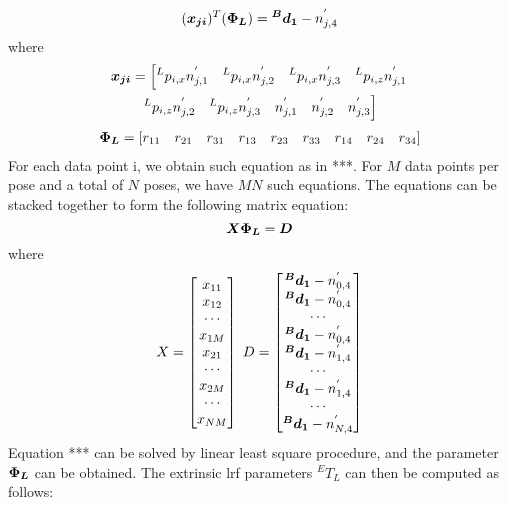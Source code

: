 \begin{equation}
  (\vb*{x_{ji}})  ^T (\vb*{\Phi_L}) = \vb*{{^B}d_1} -  n^{'}_{j,4}
\end{equation}
where 
\begin{multline}
  \vb*{x_{ji}} = \left[{^L}p_{i,x}n^{'}_{j,1} \quad {^L}p_{i,x}n^{'}_{j,2}\quad {^L}p_{i,x}n^{'}_{j,3}\quad  {^L}p_{i,z}n^{'}_{j,1}\right. \\ 
\left. {^L}p_{i,z}n^{'}_{j,2}\quad {^L}p_{i,z}n^{'}_{j,3} \quad n^{'}_{j,1} \quad n^{'}_{j,2} \quad n^{'}_{j,3} \right]
\end{multline}
\begin{multline}
  \vb*{\Phi_L} = \left[r_{11} \quad r_{21} \quad r_{31} \quad r_{13} \quad r_{23} \quad r_{33} \quad r_{14} \quad r_{24}  \quad r_{34} \right] 
\end{multline}
For each data point i, we obtain such equation as in ***. For $M$ data points per pose and a total of $N$ poses, we have $MN$ such equations. The equations can be stacked together to form the following matrix equation:
\begin{equation}
  \vb*{X}   \vb*{\Phi_L} = \vb*{D}
\end{equation}
where 
\begin{equation}
X =\begin{bmatrix}
x_{11} \\ x_{12} \\ \cdots\\x_{1M}\\ x_{21}\\ \cdots\\ x_{2M} \\ \cdots \\ x_{NM}
\end{bmatrix} \; D =\begin{bmatrix}
\vb*{{^B}d_1} -  n^{'}_{0,4} \\ \vb*{{^B}d_1} -  n^{'}_{0,4}  \\ \cdots\\ \vb*{{^B}d_1} -  n^{'}_{0,4}  \\ \vb*{{^B}d_1} -  n^{'}_{1,4} \\ \cdots\\ \vb*{{^B}d_1} -  n^{'}_{1,4}  \\ \cdots \\\vb*{{^B}d_1} -  n^{'}_{N,4} 
\end{bmatrix}
\end{equation}
Equation *** can be solved by linear least square procedure, and the parameter  $\vb*{\Phi_L}$ can be obtained. The extrinsic \ac{lrf} parameters ${^E}T_L$ can then be computed as follows:
